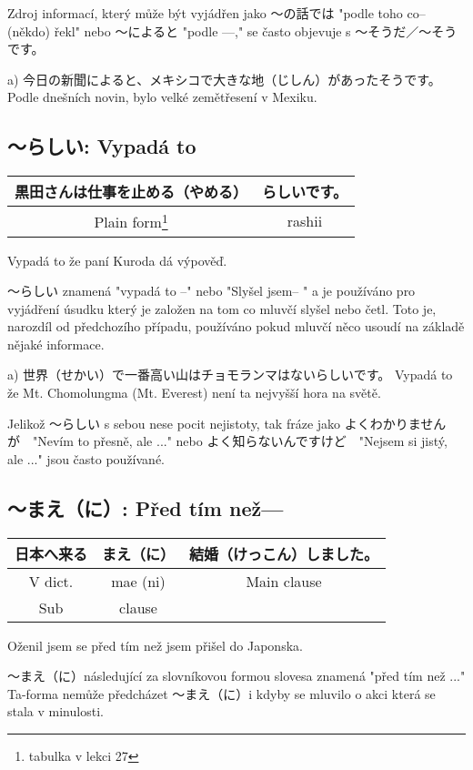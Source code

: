 Zdroj informací, který může být vyjádřen jako 〜の話では "podle toho co-- (někdo) řekl" nebo 〜によると "podle ---," se často objevuje s  〜そうだ／〜そうです。


a) 今日の新聞によると、メキシコで大きな地（じしん）があったそうです。Podle dnešních novin, bylo velké zemětřesení v  Mexiku.



\subsection{〜らしい: Vypadá to}

\begin{center}
\begin{tabular}{|| c | c ||}
黒田さんは仕事を止める（やめる） & らしいです。\\
\hline
Plain form\footnote{tabulka v lekci 27} & rashii \\
\hline
\end{tabular}
\end{center}
Vypadá to že paní Kuroda dá výpověď.


〜らしい znamená "vypadá to --" nebo  "Slyšel jsem-- " a je používáno pro vyjádření úsudku který je založen na tom co mluvčí slyšel nebo četl. Toto je, narozdíl od předchozího případu, používáno pokud mluvčí něco usoudí na základě nějaké informace.


a) 世界（せかい）で一番高い山はチョモランマはないらしいです。 Vypadá to že Mt. Chomolungma (Mt. Everest) není ta nejvyšší hora na světě.



Jelikož 〜らしい s sebou nese pocit nejistoty, tak fráze jako よくわかりませんが　"Nevím to přesně, ale ..." nebo よく知らないんですけど　"Nejsem si jistý, ale ..."  jsou často používané.


\subsection{〜まえ（に）: Před tím než---} 

\begin{center}
\begin{tabular}{|| c | c || c ||}
日本へ来る&まえ（に） & 結婚（けっこん）しました。\\
\hline
V dict. & mae (ni) & Main clause \\
Sub & clause&\\
\end{tabular}
\end{center}
Oženil jsem se před tím než jsem přišel do Japonska.

〜まえ（に）následující za slovníkovou formou slovesa znamená "před tím než ..." Ta-forma nemůže předcházet  〜まえ（に）i kdyby se mluvilo o akci která se stala v minulosti.
